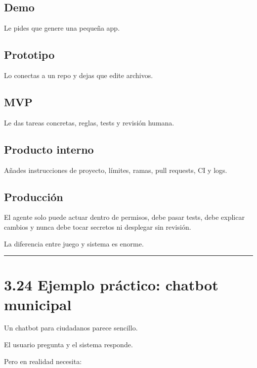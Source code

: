 \subsection{Demo}\label{demo-1}

Le pides que genere una pequeña app.

\subsection{Prototipo}\label{prototipo-1}

Lo conectas a un repo y dejas que edite archivos.

\subsection{MVP}\label{mvp-1}

Le das tareas concretas, reglas, tests y revisión humana.

\subsection{Producto interno}\label{producto-interno}

Añades instrucciones de proyecto, límites, ramas, pull requests, CI y
logs.

\subsection{Producción}\label{producciuxf3n-1}

El agente solo puede actuar dentro de permisos, debe pasar tests, debe
explicar cambios y nunca debe tocar secretos ni desplegar sin revisión.

La diferencia entre juego y sistema es enorme.

\begin{center}\rule{0.5\linewidth}{0.5pt}\end{center}

\section{3.24 Ejemplo práctico: chatbot
municipal}\label{ejemplo-pruxe1ctico-chatbot-municipal}

Un chatbot para ciudadanos parece sencillo.

El usuario pregunta y el sistema responde.

Pero en realidad necesita:

